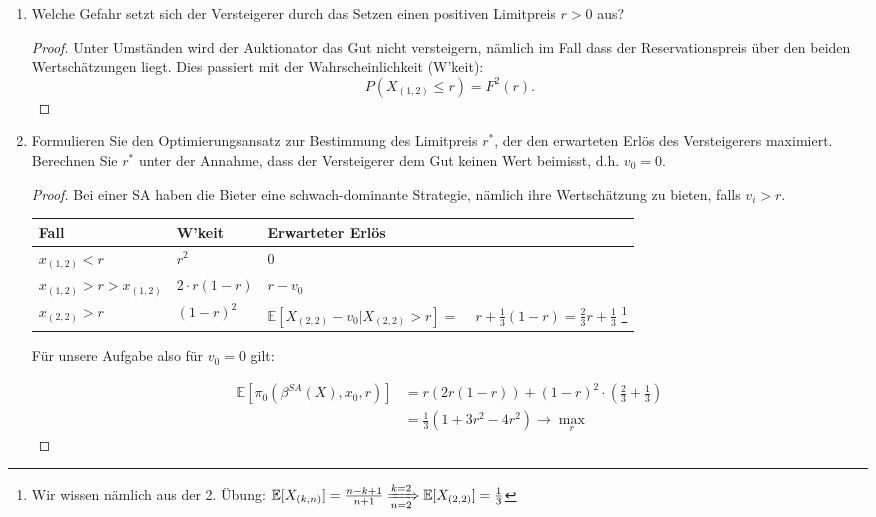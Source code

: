 \documentclass[12pt]{extreport} %
\theoremstyle{named}
\theoremstyle{itshape}
\theoremstyle{normal}
\begin{document}
\begin{enumerate}
	\item Welche Gefahr setzt sich der Versteigerer durch das Setzen einen positiven Limitpreis $r > 0$ aus?
		\begin{proof}
			Unter Umständen wird der Auktionator das Gut nicht versteigern, nämlich im Fall dass der Reservationspreis über den beiden Wertschätzungen liegt. Dies passiert mit der Wahrscheinlichkeit (W'keit):
			$$ P(X_{(1, 2)} \leq r) = F^{2}(r). $$
		\end{proof}
	\item Formulieren Sie den Optimierungsansatz zur Bestimmung des Limitpreis $r^{*}$, der den erwarteten Erlös des Versteigerers maximiert. Berechnen Sie $r^{*}$ unter der Annahme, dass der Versteigerer dem Gut keinen Wert beimisst, d.h. $v_{0} = 0$.
		\begin{proof}
			Bei einer SA haben die Bieter eine schwach-dominante Strategie, nämlich ihre Wertschätzung zu bieten, falls $v_{i} > r$.
			\begin{center}
    \begin{tabular}{| l | l | l |}
    \hline
    Fall & W'keit & Erwarteter Erlös  \\ \hline
    $x_{(1,2)} < r$ & $r^{2}$ & $0$  \\ \hline
    $x_{(1, 2)} > r > x_{(1, 2)} $ & $2 \cdot r (1 - r)$ & $r - v_{0}$  \\ \hline
    $x_{(2, 2)} > r$ & $(1-r)^{2} $  &  \pbox{20cm}{$\mathbb{E}[X_{(2,2)} - v_{0} \big| X_{(2,2)} > r] =$ \\ ~\hspace{0.25cm} $r + \frac{1}{3} (1-r) = \frac{2}{3} r + \frac{1}{3}$} \footnote{Wir wissen nämlich aus der 2. Übung: $\mathbb{E}[X_{(k, n)}] = \frac{n - k +1}{n+1} \xRightarrow[n=2]{k=2} \mathbb{E}[X_{(2,2)}] = \frac{1}{3}$}  \\ 
    \hline
    \end{tabular}
    \end{center}
   
    Für unsere Aufgabe also für $v_{0} = 0$ gilt:
    
    \begin{align*}
    	\mathbb{E}[\pi_{0}(\beta^{SA}(X), x_{0}, r)] & = r\left(2r (1-r)\right) + (1-r)^{2} \cdot \left( \frac{2}{3} + \frac{1}{3} \right) \\
    		& = \frac{1}{3}  \left( 1 + 3 r^{2} - 4 r^{2} \right) \longrightarrow \max_{r}
    \end{align*}


\end{proof}
\end{enumerate}
\end{document}
